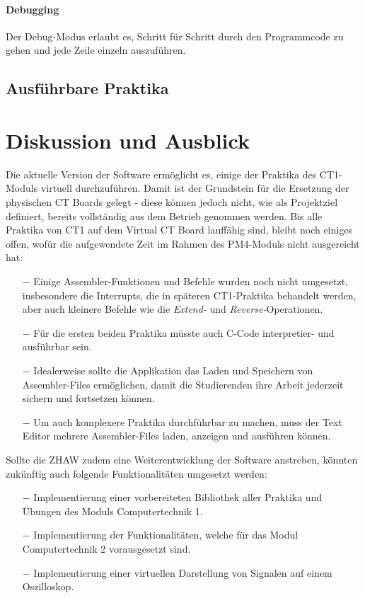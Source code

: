 \documentclass[10pt]{article}
\begin{document}
\paragraph{Debugging} Der Debug-Modus erlaubt es, Schritt für Schritt durch den Programmcode zu gehen und jede Zeile einzeln auszuführen.

\subsection{Ausführbare Praktika}


\section{Diskussion und Ausblick}

Die aktuelle Version der Software ermöglicht es, einige der Praktika des CT1-Moduls virtuell durchzuführen. Damit ist der Grundstein für die Ersetzung der physischen CT Boards gelegt - diese können jedoch nicht, wie als Projektziel definiert, bereits vollständig aus dem Betrieb genommen werden. Bis alle Praktika von CT1 auf dem \glqq Virtual CT Board\grqq{} lauffähig sind, bleibt noch einiges offen, wofür die aufgewendete Zeit im Rahmen des PM4-Moduls nicht ausgereicht hat:

\begin{itemize}
	\item[$-$] Einige Assembler-Funktionen und Befehle wurden noch nicht umgesetzt, insbesondere die Interrupts, die in späteren CT1-Praktika behandelt werden, aber auch kleinere Befehle wie die \emph{Extend-} und \emph{Reverse-}Operationen.
	\item[$-$] Für die ersten beiden Praktika müsste auch C-Code interpretier- und ausführbar sein.
	\item[$-$] Idealerweise sollte die Applikation das Laden und Speichern von Assembler-Files ermöglichen, damit die Studierenden ihre Arbeit jederzeit sichern und fortsetzen können.
	\item[$-$] Um auch komplexere Praktika durchführbar zu machen, muss der Text Editor mehrere Assembler-Files laden, anzeigen und ausführen können.


\end{itemize}


Sollte die ZHAW zudem eine Weiterentwicklung der Software anstreben, könnten zukünftig auch folgende Funktionalitäten umgesetzt werden: 
\begin{itemize}
\item[$-$] Implementierung einer vorbereiteten Bibliothek aller Praktika und Übungen des Moduls \glqq Computertechnik 1\grqq. 
\item[$-$] Implementierung der Funktionalitäten, welche für das Modul \glqq Computertechnik 2\grqq{} vorausgesetzt sind. 
\item[$-$] Implementierung einer virtuellen Darstellung von Signalen auf einem Oszilloskop.
\end{itemize}
\end{document}
